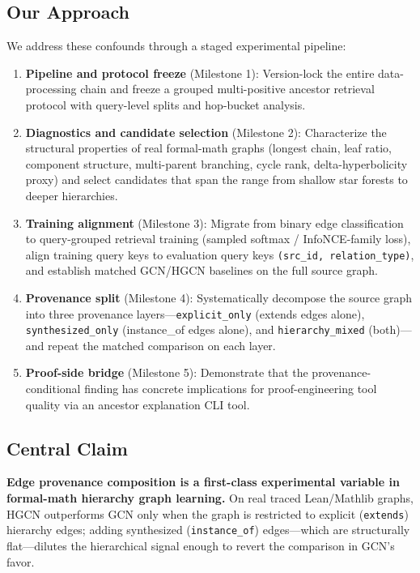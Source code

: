 \documentclass[runningheads]{llncs}
\begin{document}
\subsection{Our Approach}

We address these confounds through a staged experimental pipeline:

\begin{enumerate}
\item \textbf{Pipeline and protocol freeze} (Milestone 1): Version-lock the entire data-processing chain and freeze a grouped multi-positive ancestor retrieval protocol with query-level splits and hop-bucket analysis.
\item \textbf{Diagnostics and candidate selection} (Milestone 2): Characterize the structural properties of real formal-math graphs (longest chain, leaf ratio, component structure, multi-parent branching, cycle rank, delta-hyperbolicity proxy) and select candidates that span the range from shallow star forests to deeper hierarchies.
\item \textbf{Training alignment} (Milestone 3): Migrate from binary edge classification to query-grouped retrieval training (sampled softmax / InfoNCE-family loss), align training query keys to evaluation query keys \texttt{(src\_id, relation\_type)}, and establish matched GCN/HGCN baselines on the full source graph.
\item \textbf{Provenance split} (Milestone 4): Systematically decompose the source graph into three provenance layers---\texttt{explicit\_only} (extends edges alone), \texttt{synthesized\_only} (instance\_of edges alone), and \texttt{hierarchy\_mixed} (both)---and repeat the matched comparison on each layer.
\item \textbf{Proof-side bridge} (Milestone 5): Demonstrate that the provenance-conditional finding has concrete implications for proof-engineering tool quality via an ancestor explanation CLI tool.
\end{enumerate}

\subsection{Central Claim}

\textbf{Edge provenance composition is a first-class experimental variable in formal-math hierarchy graph learning.} On real traced Lean/Mathlib graphs, HGCN outperforms GCN only when the graph is restricted to explicit (\texttt{extends}) hierarchy edges; adding synthesized (\texttt{instance\_of}) edges---which are structurally flat---dilutes the hierarchical signal enough to revert the comparison in GCN's favor.
\end{document}
